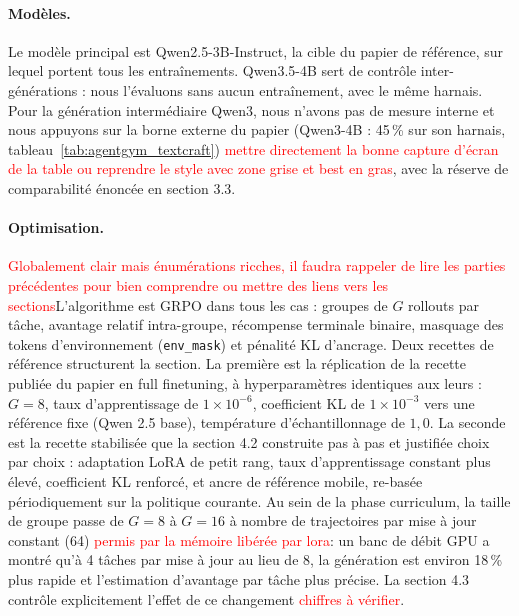 \documentclass[11pt,a4paper]{article}
\begin{document}
\paragraph{Modèles.} Le modèle principal est Qwen2.5-3B-Instruct, la cible du papier de référence, sur lequel portent tous les entraînements. Qwen3.5-4B sert de contrôle inter-générations : nous l'évaluons sans aucun entraînement, avec le même harnais. Pour la génération intermédiaire Qwen3, nous n'avons pas de mesure interne et nous appuyons sur la borne externe du papier (Qwen3-4B : 45\,\% sur son harnais, tableau~\ref{tab:agentgym_textcraft}) \textcolor{red}{mettre directement la bonne capture d'écran de la table ou reprendre le style avec zone grise et best en gras}, avec la réserve de comparabilité énoncée en section 3.3.

\paragraph{Optimisation.} \textcolor{red}{Globalement clair mais énumérations ricches, il faudra rappeler de lire les parties précédentes pour bien comprendre ou mettre des liens vers les sections}L'algorithme est GRPO dans tous les cas : groupes de $G$ rollouts par tâche, avantage relatif intra-groupe, récompense terminale binaire, masquage des tokens d'environnement (\texttt{env\_mask}) et pénalité KL d'ancrage. Deux recettes de référence structurent la section. La première est la réplication de la recette publiée du papier en full finetuning, à hyperparamètres identiques aux leurs : $G=8$, taux d'apprentissage de $1 \times 10^{-6}$, coefficient KL de $1 \times 10^{-3}$ vers une référence fixe (Qwen 2.5 base), température d'échantillonnage de $1{,}0$. La seconde est la recette stabilisée que la section 4.2 construite pas à pas et justifiée choix par choix : adaptation LoRA de petit rang, taux d'apprentissage constant plus élevé, coefficient KL renforcé, et ancre de référence mobile, re-basée périodiquement sur la politique courante. Au sein de la phase curriculum, la taille de groupe passe de $G=8$ à $G=16$ à nombre de trajectoires par mise à jour constant (64) \textcolor{red}{permis par la mémoire libérée par lora}: un banc de débit GPU a montré qu'à 4 tâches par mise à jour au lieu de 8, la génération est environ 18\,\% plus rapide et l'estimation d'avantage par tâche plus précise. La section 4.3 contrôle explicitement l'effet de ce changement \textcolor{red}{chiffres à vérifier}.
\end{document}
